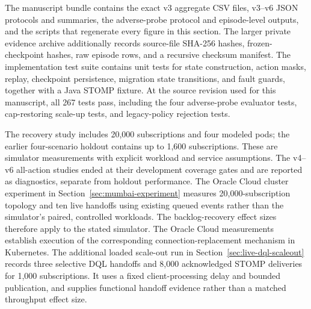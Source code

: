 The manuscript bundle contains the exact v3 aggregate CSV files, v3--v6 JSON
protocols and summaries, the adverse-probe protocol and episode-level outputs,
and the scripts that regenerate every figure in this section. The
larger private evidence archive additionally records source-file SHA-256 hashes,
frozen-checkpoint hashes, raw episode rows, and a recursive checksum manifest.
The implementation test suite contains unit tests for state construction,
action masks, replay, checkpoint persistence, migration state transitions, and
fault guards, together with a Java STOMP fixture. At the source revision used
for this manuscript, all 267 tests pass, including the four adverse-probe
evaluator tests, cap-restoring scale-up tests, and legacy-policy rejection
tests.

The recovery study includes 20,000 subscriptions and four modeled pods;
the earlier four-scenario holdout contains up to 1,600 subscriptions. These
are simulator measurements with explicit workload and service assumptions.
The v4--v6 all-action studies ended at their development coverage gates and
are reported as diagnostics, separate from holdout performance. The Oracle
Cloud cluster experiment in Section~\ref{sec:mumbai-experiment} measures
20,000-subscription topology and ten live handoffs using existing queued
events rather than the simulator's paired, controlled workloads. The
backlog-recovery effect sizes therefore apply to the stated simulator. The
Oracle Cloud measurements establish execution of the corresponding
connection-replacement mechanism in Kubernetes.
The additional loaded scale-out run in Section~\ref{sec:live-dql-scaleout}
records three selective DQL handoffs and 8,000 acknowledged STOMP deliveries
for 1,000 subscriptions. It uses a fixed client-processing delay and bounded
publication, and supplies functional handoff evidence rather than a matched
throughput effect size.

\FloatBarrier
